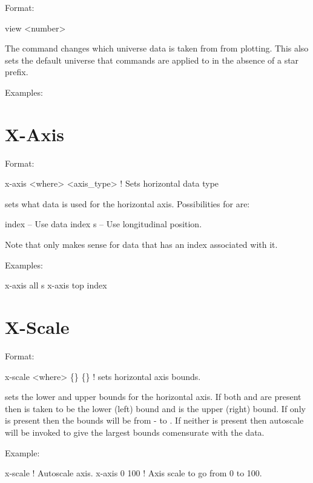 Format:
\begin{example}
  view <number>
\end{example}

\vskip 0.2in The  command changes which universe data is
taken from from plotting.  This also sets the default universe that
commands are applied to in the absence of a star prefix.  

Examples:

\section{X-Axis}
\label{s:x-axis}

Format:
\begin{example}
  x-axis <where> <axis_type> ! Sets horizontal data type
\end{example}

\vskip 0.2in  sets what data is used for the horizontal
axis. Possibilities for  are:
\begin{example}
  index    -- Use data index
  s        -- Use longitudinal position.
\end{example}
Note that  only makes sense for data that has an index
associated with it.

Examples:
\begin{example}
  x-axis all s
  x-axis top index
\end{example}

\section{X-Scale}
\label{s:x-scale}

Format:
\begin{example}
  x-scale <where> \{<bound1>\} \{<bound2>\}  ! sets horizontal axis bounds.
\end{example}

\vskip 0.2in  sets the lower and upper bounds for the
horizontal axis.  If both  and  are present
then  is taken to be the lower (left) bound and
 is the upper (right) bound. If only  is
present then the bounds will be from - to
. If neither is present then autoscale will be invoked to
give the largest bounds comensurate with the data.

Example:
\begin{example}
  x-scale       ! Autoscale axis.
  x-axis 0 100  ! Axis scale to go from 0 to 100.
\end{example}

